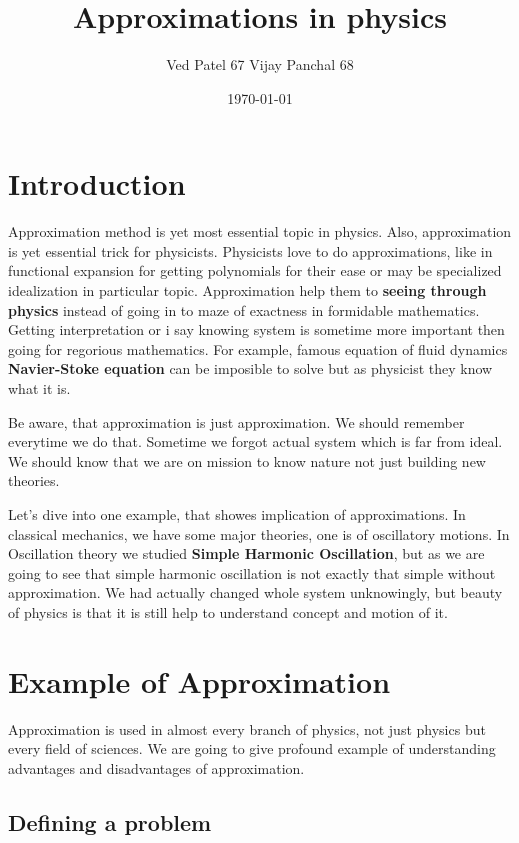 \documentclass[11pt,a4paper]{article}
\author{Ved Patel 67 Vijay Panchal 68}
\date{\today}
\title{Approximations in physics}
\begin{document}
\maketitle
\tableofcontents

\pagebreak
\section{Introduction}
\label{sec:org252628d}

Approximation method is yet most essential topic in physics. Also, approximation is yet essential trick for physicists. Physicists love to do approximations, like in functional expansion for getting polynomials for their ease or may be specialized idealization in particular topic. Approximation help them to \textbf{seeing through physics} instead of going in to maze of exactness in formidable  mathematics. Getting interpretation or i say knowing system is sometime more important then going for regorious mathematics. For example, famous equation of fluid dynamics \textbf{Navier-Stoke equation} can be imposible to solve but as physicist they know what it is.

Be aware, that approximation is just approximation. We should remember everytime we do that. Sometime we forgot actual system which is far from ideal. We should know that we are on mission to know nature not just building new theories.

Let's dive into one example, that showes implication of approximations. In classical mechanics, we have some major theories, one is of oscillatory motions. In Oscillation theory we studied \textbf{Simple Harmonic Oscillation}, but as we are going to see that simple harmonic oscillation is not exactly that simple without approximation. We had actually changed whole system unknowingly, but beauty of physics is that it is still help to understand concept and motion of it. 

\section{Example of Approximation}
\label{sec:org2bb1710}

Approximation is used in almost every branch of physics, not just physics but every field of sciences. We are going to give profound example of understanding advantages and disadvantages of approximation.

\subsection{Defining a problem}
\label{sec:orgb8c40e5}
\end{document}
